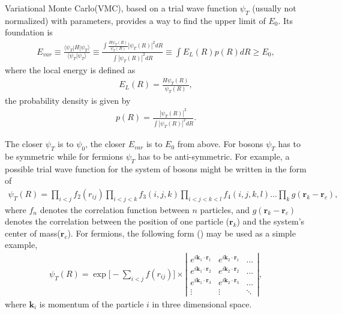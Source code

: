\documentclass[12pt,letterpaper,UTF8]{report}
\begin{document}
{Variational Monte Carlo(VMC), based on a trial wave function $\psi_T$ (usually not normalized) with parameters, provides a way to find the upper limit of $E_0$. Its foundation is
\begin{eqnarray}
E_{var}  \equiv  \frac{\langle \psi_T | H |\psi_T\rangle }{\langle \psi_T | \psi_T \rangle}
\equiv \frac{\displaystyle{\int \frac{H \psi_T(R)}{\psi_T(R)} |\psi_T(R)|^2 dR}}{\displaystyle{\int |\psi_T(R)|^2 dR}}
\equiv \int E_L (R) p(R) dR
\geq E_0,
 \label{Evar}
\end{eqnarray}
where the local energy is defined as
\begin{eqnarray}
E_L(R) = \frac{H \psi_T(R)}{\psi_T(R)},
\end{eqnarray}
the probability density is given by
\begin{eqnarray}
p(R)= \frac{ |\psi_T(R)|^2  }{\displaystyle{\int |\psi_T(R)|^2 dR}}. \label{PrVMC}
\end{eqnarray}

The closer $\psi_T$ is to $\psi_0$, the closer $E_{var}$ is to $E_0$ from above.
For bosons $\psi_T$ has to be symmetric while for fermions $\psi_T$ has to be anti-symmetric. For example, a possible trial wave function for the system of bosons might be written in the form of
\begin{eqnarray}
\psi_T(R) = \prod_{i<j} f_2(r_{ij}) \prod_{i<j<k} f_3(i,j,k) \prod_{i<j<k<l} f_4(i,j,k,l) ... \prod_{k} g(\bm{r}_k-\bm{r}_c),
\end{eqnarray}
where $f_n$ denotes the correlation function between $n$ particles, and $ g(\bm{r}_k-\bm{r}_c)$ denotes the correlation between the position of one particle ($\bm{r}_k$) and the system's center of mass($\bm{r}_c$).
For fermions, the following form (\cite{Kalosbook2008}) may be used as a simple example,
\begin{eqnarray}
\psi_T(R) = \exp \bigg[ - \sum_{i<j} f(r_{ij}) \bigg] \times
\left|\begin{matrix}
                    e^{i \bm{k}_1 \cdot \bm{r}_1 } &  e^{i \bm{k}_2 \cdot \bm{r}_1 } & ...\\
                    e^{i \bm{k}_1 \cdot \bm{r}_2 } &  e^{i \bm{k}_2 \cdot \bm{r}_2 } & ...\\
                    e^{i \bm{k}_1 \cdot \bm{r}_3 } &  e^{i \bm{k}_2 \cdot \bm{r}_3 } & ...\\
                    \vdots & \vdots & \ddots
                  \end{matrix}\right|,
\end{eqnarray}
where $\bm{k}_i$ is momentum of the particle $i$ in three dimensional space.

}
\end{document}
